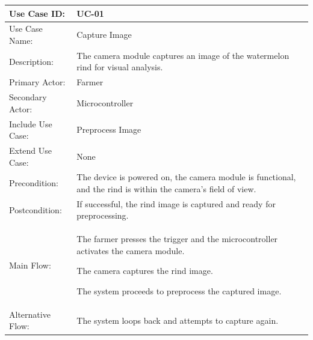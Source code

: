 \begin{thesisprose}
\FloatBarrier
\begingroup
\small
\setlength{\tabcolsep}{3pt}
\renewcommand{\arraystretch}{1.14}
\setlength{\arrayrulewidth}{0.625pt}
\def\LTcaptype{uncaptionedgrid}
\begin{longtable}{|>{\raggedright\arraybackslash}p{}|>{\raggedright\arraybackslash}p{}|}
\hline
Use Case ID: & UC-01 \\
\hline
Use Case Name: & Capture Image \\
\hline
Description: & The camera module captures an image of the watermelon rind for visual analysis. \\
\hline
Primary Actor: & Farmer \\
\hline
Secondary Actor: & Microcontroller \\
\hline
Include Use Case: & Preprocess Image \\
\hline
Extend Use Case: & None \\
\hline
Precondition: & The device is powered on, the camera module is functional, and the rind is within the camera's field of view. \\
\hline
Postcondition: & If successful, the rind image is captured and ready for preprocessing. \\
\hline
Main Flow: & The farmer presses the trigger and the microcontroller activates the camera module.\par The camera captures the rind image.\par The system proceeds to preprocess the captured image. \\
\hline
Alternative Flow: & The system loops back and attempts to capture again. \\
\hline
\end{longtable}
\endgroup


\end{thesisprose}
